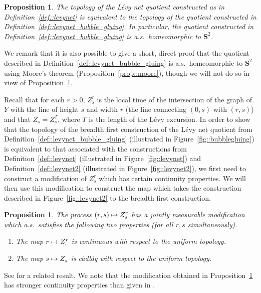 \documentclass[JEP,XML,SOM,Unicode]{cedram}
\newcommand\mto{\mathchoice{\longmapsto}{\mapsto}{\mapsto}{\mapsto}}
\theoremstyle{plain}
\numberwithin{theorem}{section}
\newtheorem{proposition}[theorem]{Proposition}
\theoremstyle{definition}
\renewcommand{\S}{{\mathbf S}}
\newcommand{\cadlag}{càdlàg}
\begin{document}
\begin{proposition}
\label{prop::levy_net_equivalent_topology}
The topology of the Lévy net quotient constructed as in Definition~\ref{def::levynet} is equivalent to the topology of the quotient constructed in Definition~\ref{def::levynet_bubble_gluing}. In particular, the quotient constructed in Definition~\ref{def::levynet_bubble_gluing} is a.s.\ homeomorphic to $\S^2$.
\end{proposition}

We remark that it is also possible to give a short, direct proof that the quotient described in Definition~\ref{def::levynet_bubble_gluing} is a.s.\ homeomorphic to $\S^2$ using Moore's theorem (Proposition~\ref{prop::moore}), though we will not do so in view of Proposition~\ref{prop::levy_net_equivalent_topology}.

Recall that for each $r > 0$, $Z_s^r$ is the local time of the intersection of the graph of~$Y$ with the line of height $s$ and width $r$ (\ie the line connecting $(0,s)$ with $(r,s)$) and that $Z_s = Z_s^T$, where $T$ is the length of the Lévy excursion. In order to show that the topology of the breadth first construction of the Lévy net quotient from Definition~\ref{def::levynet_bubble_gluing} (illustrated in Figure~\ref{fig::bubblegluing}) is equivalent to that associated with the constructions from Definition~\ref{def::levynet} (illustrated in Figure~\ref{fig::levynet}) and Definition~\ref{def::levynet2} (illustrated in Figure~\ref{fig::levynet2}), we first need to construct a modification of $Z_s^r$ which has certain continuity properties. We will then use this modification to construct the map which takes the construction described in Figure~\ref{fig::levynet2} to the breadth first construction.

\begin{proposition}
\label{prop::local_time_cadlag_modification}
The process $(r,s) \mto Z_s^r$ has a jointly measurable modification which a.s.\ satisfies the following two properties (for all $r,s$ simultaneously).
\begin{enumerate}
\item The map $r \mto Z_\cdot^r$ is continuous with respect to the uniform topology.
\item The map $s \mto Z_s^\cdot$ is {\cadlag} with respect to the uniform topology.
\end{enumerate}
\end{proposition}

See \cite[Prop.\,1.3.3]{dlg2002trees_levy} for a related result. We note that the modification obtained in Proposition~\ref{prop::local_time_cadlag_modification} has stronger continuity properties than given in \cite[Prop.\,1.3.3]{dlg2002trees_levy}.
\end{document}

